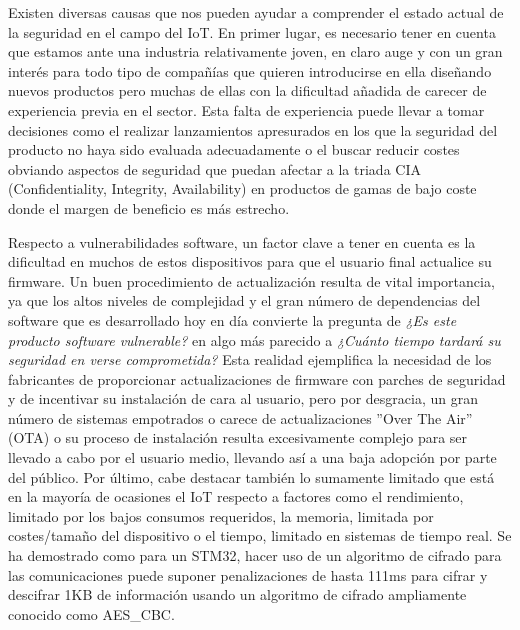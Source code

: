 Existen diversas causas que nos pueden ayudar a comprender el estado actual de la seguridad en el campo del IoT.
En primer lugar, es necesario tener en cuenta que estamos ante una industria relativamente 
joven, en claro auge y con un gran interés para todo tipo de compañías que quieren introducirse en ella diseñando 
nuevos productos pero muchas de ellas con la dificultad añadida de carecer de experiencia previa en el sector.
Esta falta de experiencia puede llevar a tomar decisiones como el realizar lanzamientos apresurados en los que la seguridad del producto no haya 
sido evaluada adecuadamente o el buscar reducir costes obviando aspectos de seguridad que puedan afectar a 
la triada CIA (Confidentiality, Integrity, Availability) en productos de gamas de bajo coste donde el margen de beneficio 
es más estrecho.\bigskip

Respecto a vulnerabilidades software, un factor clave a tener en cuenta es la dificultad en muchos de estos 
dispositivos para que el usuario final actualice su firmware. Un buen procedimiento de actualización resulta de vital importancia, ya que los altos niveles de complejidad y el gran número de dependencias del software
que es desarrollado hoy en día convierte la pregunta de \textit{¿Es este producto software vulnerable?} en algo más parecido a 
\textit{¿Cuánto tiempo tardará su seguridad en verse comprometida?} Esta realidad ejemplifica la necesidad de los fabricantes de 
proporcionar actualizaciones de firmware con parches de seguridad y de incentivar su instalación de cara al usuario, pero por 
desgracia, un gran número de sistemas empotrados o carece de actualizaciones ''Over The Air'' (OTA) o su proceso de instalación resulta excesivamente complejo para ser llevado a cabo por el usuario medio, llevando así a una baja adopción por parte del público.
Por último, cabe destacar también lo sumamente limitado que está en la mayoría de ocasiones el IoT respecto a factores como el
rendimiento, limitado por los bajos consumos requeridos, la memoria, limitada por costes/tamaño del dispositivo o el tiempo, limitado en sistemas de tiempo real. 
Se ha demostrado como para un STM32, hacer uso de un algoritmo de cifrado para las comunicaciones puede suponer 
penalizaciones de hasta 111ms\cite{performance} para cifrar y descifrar 1KB de información usando un algoritmo de cifrado ampliamente conocido como AES\_CBC.\bigskip

